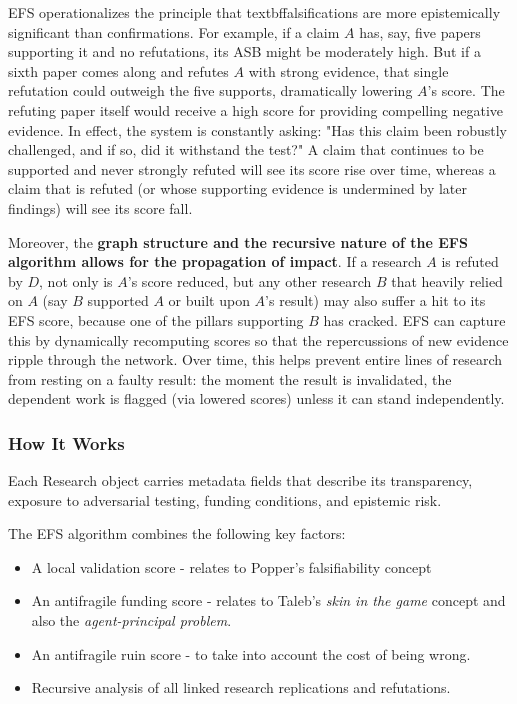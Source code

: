 \documentclass{article}
\begin{document}
EFS operationalizes the principle that textbf{falsifications are more epistemically significant than confirmations}. For example, if a claim $A$ has, say, five papers supporting it and no refutations, its ASB might be moderately high. But if a sixth paper comes along and refutes $A$ with strong evidence, that single refutation could outweigh the five supports, dramatically lowering $A$'s score. The refuting paper itself would receive a high score for providing compelling negative evidence. In effect, the system is constantly asking: "Has this claim been robustly challenged, and if so, did it withstand the test?" A claim that continues to be supported and never strongly refuted will see its score rise over time, whereas a claim that is refuted (or whose supporting evidence is undermined by later findings) will see its score fall.

Moreover, the \textbf{graph structure and the recursive nature of the EFS algorithm allows for the propagation of impact}. If a research $A$ is refuted by $D$, not only is $A$'s score reduced, but any other research $B$ that heavily relied on $A$ (say $B$ supported $A$ or built upon $A$'s result) may also suffer a hit to its EFS score, because one of the pillars supporting $B$ has cracked. EFS can capture this by dynamically recomputing scores so that the repercussions of new evidence ripple through the network. Over time, this helps prevent entire lines of research from resting on a faulty result: the moment the result is invalidated, the dependent work is flagged (via lowered scores) unless it can stand independently. 

\subsubsection{How It Works}
Each Research object carries metadata fields that describe its transparency, exposure to adversarial testing, funding conditions, and epistemic risk. 

The EFS algorithm combines the following key factors:
\begin{itemize}
	\item A local validation score - relates to Popper's falsifiability concept
	\item An antifragile funding score - relates to Taleb's \emph{skin in the game} concept and also the \emph{agent-principal problem}.
	\item An antifragile ruin score - to take into account the cost of being wrong.
	\item Recursive analysis of all linked research replications and refutations.
\end{itemize}
\end{document}
